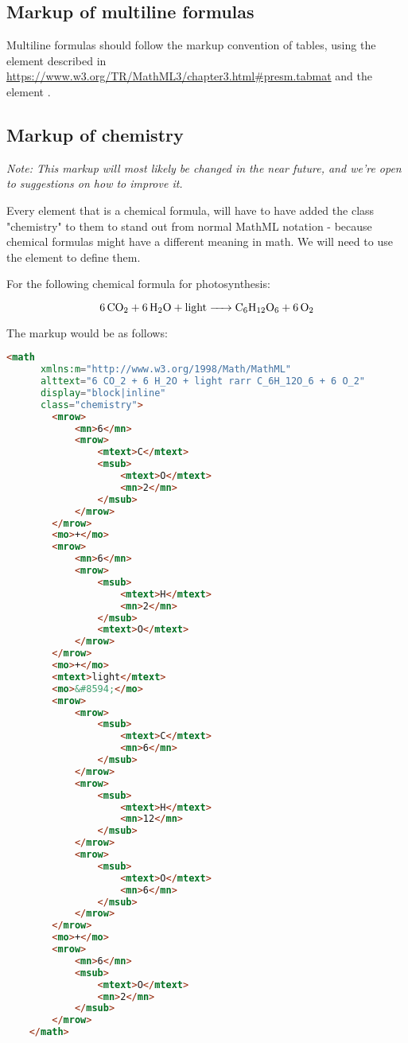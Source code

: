 \documentclass[english,a4paper,11pt]{article}
\begin{document}
\subsection{Markup of multiline formulas}

Multiline formulas should follow the markup convention of tables, using the  element described in \url{https://www.w3.org/TR/MathML3/chapter3.html#presm.tabmat} and the element .

\subsection{Markup of chemistry}\label{chemistry}

\textit{Note: This markup will most likely be changed in the near future, and we're open to suggestions on how to improve it.}

Every  element that is a chemical formula, will have to have added the class "chemistry" to them to stand out from normal MathML notation - because chemical formulas might have a different meaning in math. We will need to use the  element to define them. 

For the following chemical formula for photosynthesis:

\begin{examples}
\begin{equation}
    \ce{6 CO_2 + 6 H_2O + light -> C_6H_12O_6 + 6 O_2}
\end{equation}

The markup would be as follows:
\begin{lstlisting}[language=HTML]
	<math 
	  xmlns:m="http://www.w3.org/1998/Math/MathML"
	  alttext="6 CO_2 + 6 H_2O + light rarr C_6H_12O_6 + 6 O_2"
	  display="block|inline"
	  class="chemistry">
		<mrow>
			<mn>6</mn>
			<mrow>
				<mtext>C</mtext>
				<msub>
					<mtext>O</mtext>
					<mn>2</mn>
				</msub>
			</mrow>
		</mrow>
		<mo>+</mo>
		<mrow>
			<mn>6</mn>
			<mrow>
				<msub>
					<mtext>H</mtext>
					<mn>2</mn>
				</msub>
				<mtext>O</mtext>
			</mrow>
		</mrow>
		<mo>+</mo>
		<mtext>light</mtext>
		<mo>&#8594;</mo>
		<mrow>
			<mrow>
				<msub>
					<mtext>C</mtext>
					<mn>6</mn>
				</msub>
			</mrow>
			<mrow>
				<msub>
					<mtext>H</mtext>
					<mn>12</mn>
				</msub>
			</mrow>
			<mrow>
				<msub>
					<mtext>O</mtext>
					<mn>6</mn>
				</msub>
			</mrow>
		</mrow>
		<mo>+</mo>
		<mrow>
			<mn>6</mn>
			<msub>
				<mtext>O</mtext>
				<mn>2</mn>
			</msub>
		</mrow>
	</math>
\end{lstlisting}
\end{examples}
\end{document}

